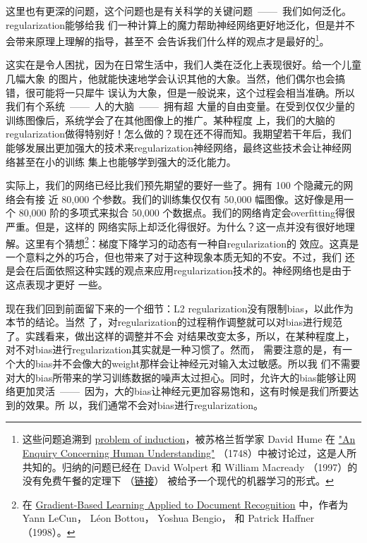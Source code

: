 这里也有更深的问题，这个问题也是有关科学的关键问题~——~我们如何泛化。\gls*{regularization}能够给我
们一种计算上的魔力帮助神经网络更好地泛化，但是并不会带来原理上理解的指导，甚至不
会告诉我们什么样的观点才是最好的\footnote{这些问题追溯到
  \href{http://en.wikipedia.org/wiki/Problem_of_induction}{problem of
    induction}，被苏格兰哲学家 David Hume 在
  \href{http://www.gutenberg.org/ebooks/9662}{"An Enquiry Concerning Human
    Understanding"} （1748）中被讨论过，这是人所共知的。归纳的问题已经在 David Wolpert 
		和 William Macready （1997）的没有免费午餐的定理下%
		（\href{http://ieeexplore.ieee.org/xpl/articleDetails.jsp?tp=&arnumber=585893}{链接}）%
		被给予一个现代的机器学习的形式。}。

这实在是令人困扰，因为在日常生活中，我们人类在泛化上表现很好。给一个儿童几幅大象
的图片，他就能快速地学会认识其他的大象。当然，他们偶尔也会搞错，很可能将一只犀牛
误认为大象，但是一般说来，这个过程会相当准确。所以我们有个系统~——~人的大脑~——~拥有超
大量的自由变量。在受到仅仅少量的训练图像后，系统学会了在其他图像上的推广。某种程度
上，我们的大脑的\gls*{regularization}做得特别好！怎么做的？现在还不得而知。我期望若干年后，我们
能够发展出更加强大的技术来\gls*{regularization}神经网络，最终这些技术会让神经网络甚至在小的训练
集上也能够学到强大的泛化能力。

实际上，我们的网络已经比我们预先期望的要好一些了。拥有 100 个隐藏元的网络会有接
近 80,000 个参数。我们的训练集仅仅有 50,000 幅图像。这好像是用一个 80,000
阶的多项式来拟合 50,000 个数据点。我们的网络肯定会\gls*{overfitting}得很严重。但是，这样的
网络实际上却泛化得很好。为什么？这一点并没有很好地理解。这里有个猜想\footnote{在
  \href{http://yann.lecun.com/exdb/publis/pdf/lecun-01a.pdf}{Gradient-Based
    Learning Applied to Document Recognition} 中，作者为 Yann LeCun， Léon Bottou，
  Yoshua Bengio， 和 Patrick Haffner （1998）。}：梯度下降学习的动态有一种自\gls*{regularization}的
效应。这真是一个意料之外的巧合，但也带来了对于这种现象本质无知的不安。不过，我们
还是会在后面依照这种实践的观点来应用\gls*{regularization}技术的。神经网络也是由于这点表现才更好
一些。

现在我们回到前面留下来的一个细节：L2 \gls*{regularization}没有限制\gls*{bias}，以此作为本节的结论。当然
了，对\gls*{regularization}的过程稍作调整就可以对\gls*{bias}进行规范了。实践看来，做出这样的调整并不会
对结果改变太多，所以，在某种程度上，对不对\gls*{bias}进行\gls*{regularization}其实就是一种习惯了。然而，
需要注意的是，有一个大的\gls*{bias}并不会像大的\gls*{weight}那样会让神经元对输入太过敏感。所以我
们不需要对大的\gls*{bias}所带来的学习训练数据的噪声太过担心。同时，允许大的\gls*{bias}能够让网
络更加灵活~——~因为，大的\gls*{bias}让神经元更加容易饱和，这有时候是我们所要达到的效果。所
以，我们通常不会对\gls*{bias}进行\gls*{regularization}。

